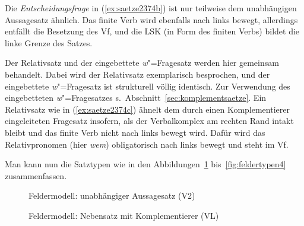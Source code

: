 Die \textit{Entscheidungsfrage} in (\ref{ex:saetze2374b}) ist nur teilweise dem unabhängigen Aussagesatz ähnlich.
Das finite Verb wird ebenfalls nach links bewegt, allerdings entfällt die Besetzung des Vf, und die LSK (in Form des finiten Verbs) bildet die linke Grenze des Satzes.


Der Relativsatz und der eingebettete \textit{w}"=Fragesatz werden hier gemeinsam behandelt.
Dabei wird der Relativsatz exemplarisch besprochen, und der eingebettete \textit{w}"=Fragesatz ist strukturell völlig identisch.
Zur Verwendung des eingebetteten \textit{w}"=Fragesatzes s.\ Abschnitt~\ref{sec:komplementsaetze}.
Ein Relativsatz wie in (\ref{ex:saetze2374c}) ähnelt dem durch einen Komplementierer eingeleiteten Fragesatz insofern, als der Verbalkomplex am rechten Rand intakt bleibt und das finite Verb nicht nach links bewegt wird.
Dafür wird das Relativpronomen (hier \textit{wem}) obligatorisch nach links bewegt und steht im Vf.

Man kann nun die Satztypen wie in den Abbildungen~\ref{fig:feldertypen1} bis~\ref{fig:feldertypen4} zusammenfassen.

\begin{figure}
  \caption{Feldermodell: unabhängiger Aussagesatz (V2)}
  \label{fig:feldertypen1}
\end{figure}

\begin{figure}
  \caption{Feldermodell: Nebensatz mit Komplementierer (VL)}
  \label{fig:feldertypen2}
\end{figure}

